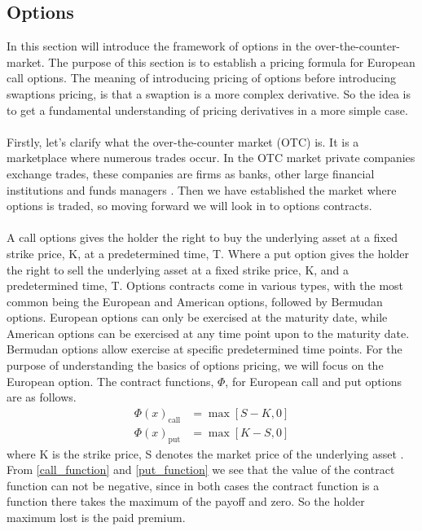 \subsection{Options}
In this section will introduce the framework of options in the over-the-counter-market. 
The purpose of this section is to establish a pricing formula for European call options.
The meaning of introducing pricing of options before introducing swaptions pricing, is that a swaption is  a 
more complex derivative. So the idea is to get a fundamental understanding of pricing derivatives in a more simple case.
\\\\
Firstly, let's clarify what the over-the-counter market (OTC) is. It is  a marketplace where numerous trades occur.
In the OTC market private companies exchange trades, these companies are firms as banks, other 
large financial institutions and funds managers \cite{Hull}. Then we have established the market where 
options is traded, so moving forward we will look in to options contracts. 
\\\\
A call options gives the holder the right to buy the underlying asset at a fixed strike price, K, at a 
predetermined time, T. Where a put option gives the holder the right to sell the underlying asset at a fixed
strike price, K, and a predetermined time, T. Options contracts come in various types, with the 
most common being the European and American options, followed by Bermudan options. European options can only 
be exercised at the maturity date, while American options can be exercised at any time point upon to the maturity date.
Bermudan options allow exercise at specific predetermined time points.
For the purpose of understanding the basics of options pricing, we will focus on the European option. 
The contract functions, $\Phi$, for European call and put options are as follows.
\begin{align}
    \Phi(x)_{\text{call}} &=  \max[S-K,0] \label{call_function}\\ 
    \Phi(x)_{\text{put}} &= \max [K-S,0] \label{put_function}
\end{align}
where K is the strike price, S denotes the market price of the underlying asset \cite{Bjork}. From \autoref{call_function} and \autoref{put_function} we see
that the value of the contract function can not be negative, since in both cases the contract function is a 
function there takes the maximum of the payoff and zero. So the holder maximum lost is the paid premium. 
